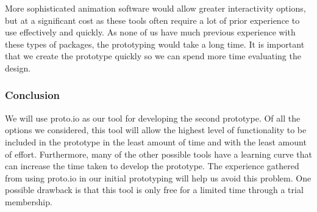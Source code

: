 More sophisticated animation software would allow greater
interactivity options, but at a significant cost as these tools often require a
lot of prior experience to use effectively and quickly. As none of us have much
previous experience with these types of packages, the prototyping would take a
long time. It is important that we create the prototype quickly so we can spend
more time evaluating the design.

\subsubsection{Conclusion}

We will use proto.io as our tool for developing the second prototype. Of all
the options we considered, this tool will allow the highest level of
functionality to be included in the prototype in the least amount of time and
with the least amount of effort. Furthermore, many of the other possible tools
have a learning curve that can increase the time taken to develop the
prototype. The experience gathered from using proto.io in our initial
prototyping will help us avoid this problem. One possible drawback is that this
tool is only free for a limited time through a trial membership.

\restoregeometry%
